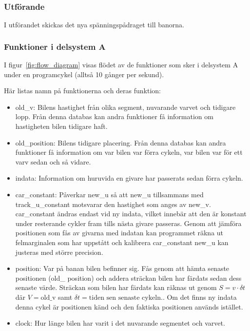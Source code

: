     \subsubsection{Utförande}

    I utförandet skickas det nya spänningspådraget till banorna. 
	
    \subsubsection{Funktioner i delsystem A} \label{sec:system_a_funcs}
    I figur~\ref{fig:flow_diagram} visas flödet av de funktioner som sker i delsystem A under en programcykel (alltså 10 gånger per sekund).

    Här listas namn på funktionerna och deras funktion:
    \begin{itemize}
	\item old\_v: Bilens hastighet från olika segment, nuvarande varvet och tidigare lopp. Från denna databas kan andra funktioner få information om hastigheten bilen tidigare haft.
  \item old\_position: Bilens tidigare placering. Från denna databas kan andra funktioner få information om var bilen var förra cykeln, var bilen var för ett varv sedan och så vidare.
      \item indata: Information om huruvida en givare har passerats sedan förra cykeln.

      \item car\_constant: Påverkar new\_u så att new\_u tillsammans med track\_u\_constant motsvarar den hastighet som anges av new\_v. car\_constant ändras endast vid ny indata, vilket innebär att den är konstant under resterande cykler fram tills nästa givare passeras. Genom att jämföra positionen som fås av givarna med indatan kan programmet räkna ut felmarginalen som har uppstått och kalibrera car\_constant new\_u kan justeras med större precision.
 
      \item position: Var på banan bilen befinner sig. Fås genom att hämta senaste positionen (old\_ position) och addera sträckan bilen har färdats sedan dess senaste värde. Sträckan som bilen har färdats kan räknas ut genom $S = v \cdot \delta t$ där $V = \textrm{old\_v}$ samt $\delta t = \textrm{tiden sen senaste cykeln}.$. Om det finns ny indata denna cykel är positionen känd och den faktiska positionen används istället.
      \item clock: Hur länge bilen har varit i det nuvarande segmentet och varvet.


\end{itemize}
